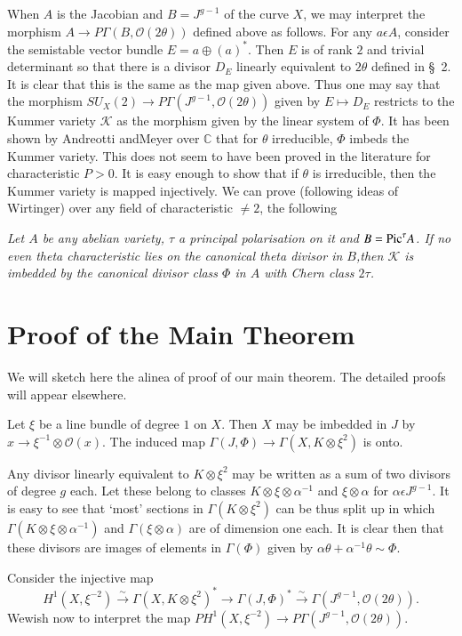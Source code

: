 When $A$ is the Jacobian and $B=J^{g-1}$ of the curve $X$, we may
interpret the morphism $A\to P\Gamma(B,\mathscr{O}(2\theta))$ defined
above as follows. For any $a\epsilon A$, consider the semistable
vector bundle $E=a\oplus (a)^{\ast}$. Then $E$ is of rank $2$ and
trivial determinant so that there is a divisor $D_E$ linearly
equivalent to $2\theta$ defined in \S\ 2. It is clear that this is
the same as the map given above. Thus one may say that the morphism
$SU_X(2)\to P\Gamma(J^{g-1},\mathscr{O}(2\theta))$ given by $E\mapsto
D_E$ restricts to the Kummer variety $\mathscr{K}$ as the morphism
given by the linear system of $\Phi$. It has been shown by Andreotti
and\pageoriginale Meyer over $\mathbb{C}$ that for $\theta$ irreducible, $\Phi$
imbeds the Kummer variety. This does not seem to have been proved in
the literature for characteristic $P>0$. It is easy enough to show
that if $\theta$ is irreducible, then the Kummer variety is mapped
injectively. We can prove (following ideas of Wirtinger\cite{key7})
over any field of characteristic $\neq 2$, the following 

\begin{TM}
\textit{Let $A$ be any abelian variety, $\tau$ a principal
  polarisation on it and $B=\mathrm{Pic}^{\tau}A$. If no even theta
  characteristic lies on the canonical theta divisor in $B$,then
  $\mathscr{K}$ is imbedded by the canonical divisor class $\Phi$ in
  $A$ with Chern class $2\tau$.}
\end{TM}

\section{Proof of the Main Theorem}\label{s4}

We will sketch here the alinea of proof of our main theorem. The
detailed proofs will appear elsewhere. 

\begin{lemma}\label{lemma4.1}
Let $\xi$ be a line bundle of degree $1$ on $X$. Then $X$ may be
imbedded in $J$ by $x\to \xi^{-1}\otimes \mathscr{O}(x)$. The induced
map $\Gamma(J,\Phi)\to \Gamma(X,K\otimes \xi^{2})$ is onto. 
\end{lemma}


\begin{Proof}
Any divisor linearly equivalent to $K\otimes \xi^{2}$ may be written
as a sum of two divisors of degree $g$ each. Let these belong to
classes $K\otimes \xi \otimes \alpha^{-1}$ and $\xi \otimes \alpha$
for $\alpha \epsilon J^{g-1}$. It is easy to see that `most' sections
in $\Gamma(K\otimes \xi^{2})$ can be thus split up in which
$\Gamma\left(K\otimes \xi \otimes \alpha^{-1}\right)$ and
$\Gamma(\xi\otimes \alpha)$ are of dimension one each. It is clear
then that these divisors are images of elements in $\Gamma(\Phi)$
given by $\alpha \theta +\alpha^{-1}\theta \sim \Phi$. 

Consider the injective map 
$$
H^{1}\left(X,\xi^{-2}\right)\xrightarrow{\sim} \Gamma\left(X,K\otimes
\xi^{2}\right)^{\ast}\to
\Gamma(J,\Phi)^{\ast}\xrightarrow{\sim}\Gamma(J^{g-1},\mathscr{O}(2\theta)). 
$$
We\pageoriginale wish now to interpret the map $PH^{1}\left(X,\xi^{-2}\right)\to
P\Gamma(J^{g-1},\mathscr{O}(2\theta))$. 
\end{Proof}

